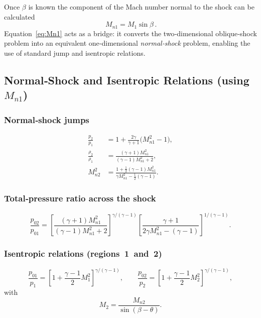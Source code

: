 \documentclass[11pt]{article}
\begin{document}
Once $\beta$ is known the component of the Mach number normal to the shock can be calculated
\begin{equation}
  \boxed{\,M_{n1} = M_{1}\sin\beta\,}.
  \label{eq:Mn1}
\end{equation}
Equation~\eqref{eq:Mn1} acts as a bridge: it converts the
two‑dimensional oblique‑shock problem into an equivalent
one‑dimensional \emph{normal‑shock} problem, enabling the use of
standard jump and isentropic relations.

\subsection{Normal‑Shock and Isentropic Relations (using $M_{n1}$)}

\subsubsection*{Normal‑shock jumps}
\begin{align}
  \frac{p_{2}}{p_{1}}
    &= 1 + \frac{2\gamma}{\gamma+1}\bigl(M_{n1}^{2}-1\bigr),
    \label{eq:p2p1}\\[4pt]
  \frac{\rho_{2}}{\rho_{1}}
    &= \frac{(\gamma+1)M_{n1}^{2}}
            {(\gamma-1)M_{n1}^{2}+2},
    \label{eq:rho2rho1}\\[4pt]
  M_{n2}^{2}
    &= \frac{1+\tfrac12(\gamma-1)M_{n1}^{2}}
            {\gamma M_{n1}^{2}-\tfrac12(\gamma-1)}.
    \label{eq:Mn2}
\end{align}

\subsubsection*{Total‑pressure ratio across the shock}
\begin{equation}
  \frac{p_{02}}{p_{01}} =
    \left[\frac{(\gamma+1)M_{n1}^{2}}
               {(\gamma-1)M_{n1}^{2}+2}\right]^{\gamma/(\gamma-1)}
    \left[\frac{\gamma+1}
               {2\gamma M_{n1}^{2}-(\gamma-1)}\right]^{1/(\gamma-1)}.
  \label{eq:total-pressure-ratio}
\end{equation}

\subsubsection*{Isentropic relations (regions 1 and 2)}
\begin{equation}
  \frac{p_{01}}{p_{1}}
    = \left[1+\frac{\gamma-1}{2}M_{1}^{2}\right]^{\gamma/(\gamma-1)},
  \qquad
  \frac{p_{02}}{p_{2}}
    = \left[1+\frac{\gamma-1}{2}M_{2}^{2}\right]^{\gamma/(\gamma-1)},
  \label{eq:isentropic}
\end{equation}
with
\begin{equation}
  M_{2} = \frac{M_{n2}}{\sin(\beta-\theta)}.
  \label{eq:M2}
\end{equation}
\end{document}
